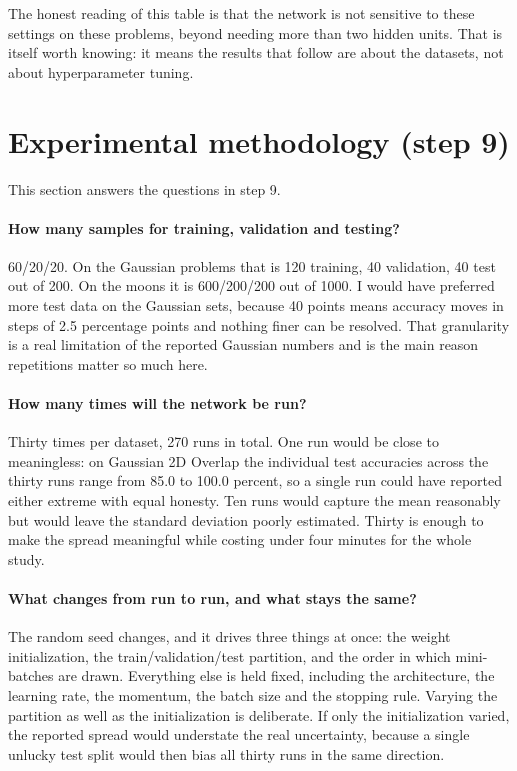 \documentclass[11pt]{article}
\begin{document}
The honest reading of this table is that the network is not sensitive to these
settings on these problems, beyond needing more than two hidden units. That is
itself worth knowing: it means the results that follow are about the datasets,
not about hyperparameter tuning.

\section{Experimental methodology (step 9)}
\label{sec:method}

This section answers the questions in step 9.

\paragraph{How many samples for training, validation and testing?}
60/20/20. On the Gaussian problems that is 120 training, 40 validation, 40 test
out of 200. On the moons it is 600/200/200 out of 1000. I would have preferred
more test data on the Gaussian sets, because 40 points means accuracy moves in
steps of 2.5 percentage points and nothing finer can be resolved. That
granularity is a real limitation of the reported Gaussian numbers and is the
main reason repetitions matter so much here.

\paragraph{How many times will the network be run?}
Thirty times per dataset, 270 runs in total. One run would be close to
meaningless: on Gaussian 2D Overlap the individual test accuracies across the
thirty runs range from 85.0 to 100.0 percent, so a single run could have
reported either extreme with equal honesty. Ten runs would capture the mean
reasonably but would leave the standard deviation poorly estimated. Thirty is
enough to make the spread meaningful while costing under four minutes for the
whole study.

\paragraph{What changes from run to run, and what stays the same?}
The random seed changes, and it drives three things at once: the weight
initialization, the train/validation/test partition, and the order in which
mini-batches are drawn. Everything else is held fixed, including the
architecture, the learning rate, the momentum, the batch size and the stopping
rule. Varying the partition as well as the initialization is deliberate. If only
the initialization varied, the reported spread would understate the real
uncertainty, because a single unlucky test split would then bias all thirty
runs in the same direction.
\end{document}
